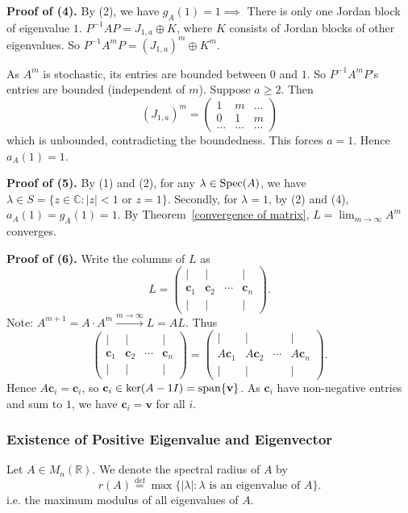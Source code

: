 \begin{pfbox}
\textbf{Proof of (4).}
By (2), we have $g_A(1)=1\implies$ There is only one Jordan block of eigenvalue $1$.
$P^{-1}AP=J_{1,a}\oplus K$, where $K$ consists of Jordan blocks of other eigenvalues.
So $P^{-1}A^mP=(J_{1,a})^m\oplus K^m$.

As $A^m$ is stochastic, its entries are bounded between $0$ and $1$.
So $P^{-1}A^mP$'s entries are bounded (independent of $m$).
Suppose $a\ge 2$. Then
\[
(J_{1,a})^m
=
\begin{pmatrix}
    1 & m & \dots \\
    0 & 1 & m \\
    \dots & \dots & \dots
\end{pmatrix}
\]
which is unbounded, contradicting the boundedness. This forces $a=1$. Hence $a_A(1)=1$.

\textbf{Proof of (5).}
By (1) and (2), for any $\lambda\in\operatorname{Spec}(A)$, we have $\lambda\in S=\{z\in\mathbb{C}: |z|<1 \text{ or } z=1\}$.
Secondly, for $\lambda=1$, by (2) and (4), $a_A(1)=g_A(1)=1$.
By Theorem~\eqref{convergence of matrix}, $L=\displaystyle\lim_{m\to\infty} A^m$ converges.

\textbf{Proof of (6).}
Write the columns of $L$ as
\[
L
=
\begin{pmatrix}
| & | & & |\\
\mathbf{c}_1 & \mathbf{c}_2 & \cdots & \mathbf{c}_n\\
| & | & & |
\end{pmatrix}.
\]
Note: $A^{m+1}=A\cdot A^m\xrightarrow{m\to\infty} L=AL$.
Thus
\[
\begin{pmatrix}
| & | & & |\\
\mathbf{c}_1 & \mathbf{c}_2 & \cdots & \mathbf{c}_n\\
| & | & & |
\end{pmatrix}
=
\begin{pmatrix}
| & | & & |\\
A\mathbf{c}_1 & A\mathbf{c}_2 & \cdots & A\mathbf{c}_n\\
| & | & & |
\end{pmatrix}.
\]
Hence $A\mathbf{c}_i=\mathbf{c}_i$, so $\mathbf{c}_i\in\ker(A-1I)=\operatorname{span}\{\mathbf{v}\}$.
As $\mathbf{c}_i$ have non-negative entries and sum to $1$, we have $\mathbf{c}_i=\mathbf{v}$ for all $i$.
\end{pfbox}



\subsubsection*{Existence of Positive Eigenvalue and Eigenvector}
\begin{definition}
Let $A\in M_n(\mathbb{R})$. We denote the spectral radius of $A$ by
\[
r(A)
\overset{\mathrm{def}}{=}
\max\{ |\lambda| : \lambda \text{ is an eigenvalue of } A \}.
\]
i.e. the maximum modulus of all eigenvalues of $A$.
\end{definition}

